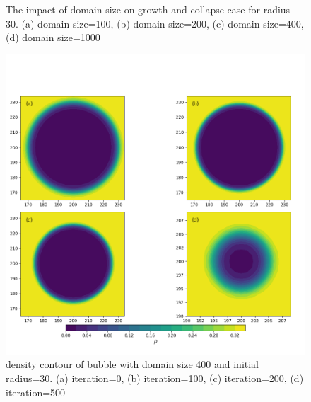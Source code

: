 \documentclass[review]{elsarticle}
\begin{document}
\setlength{\abovecaptionskip}{20pt} %
\begin{figure}[htp!]
	\centering
	\setlength{}
	\setlength{}
	\caption{The impact of domain size on growth and collapse case for radius 30. (a) domain size=100, (b) domain size=200, (c) domain size=400, (d) domain size=1000}
	\label{fig:domain}
\end{figure}

\begin{figure}[htp!]
	\centering
	\includegraphics[scale=0.4]{contour.png}
	\caption{density contour of bubble with domain size 400 and initial radius=30. (a) iteration=0, (b) iteration=100, (c) iteration=200, (d) iteration=500}
	\label{fig:con}
\end{figure}
\end{document}
